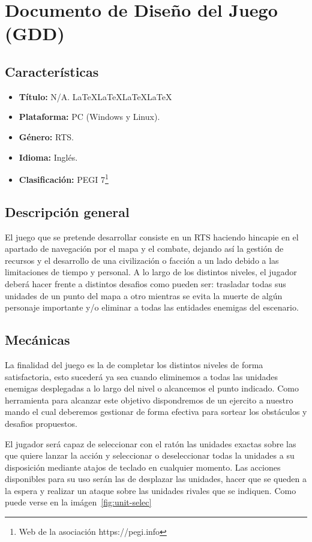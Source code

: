 \chapter{Documento de Diseño del Juego (GDD)}
\label{GDD}
\section{Características}
\begin{itemize}
	\item \textbf{Título:} N/A. \LaTeX \LaTeX \LaTeX \LaTeX
	\item \textbf{Plataforma:} \ac{PC} (Windows y Linux).
	\item \textbf{Género:} \acf{RTS}.
	\item \textbf{Idioma:} Inglés.
	\item \textbf{Clasificación:} PEGI 7\footnote{Web de la asociación https://pegi.info}
\end{itemize}

\section{Descripción general}
El juego que se pretende desarrollar consiste en un \ac{RTS} haciendo hincapie en el
apartado de navegación por el mapa y el combate, dejando así la gestión de recursos
y el desarrollo de una civilización o facción a un lado debido a las limitaciones
de tiempo y personal. A lo largo de los distintos niveles, el jugador deberá hacer
frente a distintos desafios como pueden ser: trasladar todas sus unidades de un punto
del mapa a otro mientras se evita la muerte de algún personaje importante y/o eliminar
a todas las entidades enemigas del escenario.

\section{Mecánicas}
La finalidad del juego es la de completar los distintos niveles de forma satisfactoria,
esto sucederá ya sea cuando eliminemos a todas las unidades enemigas desplegadas a lo
largo del nivel o alcancemos el punto indicado. Como herramienta para alcanzar este
objetivo dispondremos de un ejercito a nuestro mando el cual deberemos gestionar de
forma efectiva para sortear los obstáculos y desafios propuestos.

El jugador será capaz de seleccionar con el ratón las unidades exactas sobre las que
quiere lanzar la acción y seleccionar o deseleccionar todas la unidades a su
disposición mediante atajos de teclado en cualquier momento. Las acciones disponibles
para su uso serán las de desplazar las unidades, hacer que se queden a la espera y
realizar un ataque sobre las unidades rivales que se indiquen. Como puede verse en la
imágen~\ref{fig:unit-selec}

